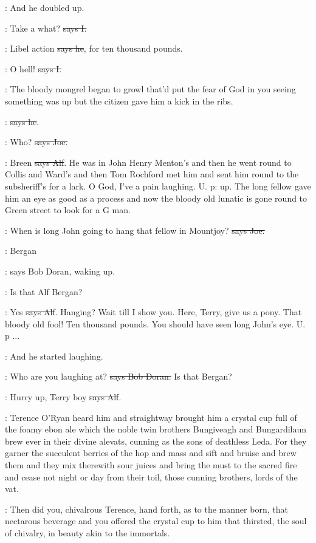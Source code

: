 \Nq:
And he doubled up.

:
Take a what? \sout{says I.}

\bergan:
Libel action \sout{says he},
for ten thousand pounds.

:
O hell! \sout{says I.}

\Nq:
The bloody mongrel began to growl that'd put the fear of God in you
seeing something was up but the citizen gave him a kick in the ribs.

\citizen:
 \sout{says he}.

\joe:
Who? \sout{says Joe.}

\bergan:
Breen \sout{says Alf}.
He was in John Henry Menton's and then he went round
to Collis and Ward's and then Tom Rochford met him and sent him round
to the subsheriff's for a lark. O God, I've a pain laughing. U. p: up. The
long fellow gave him an eye as good as a process
and now the bloody old
lunatic is gone round to Green street to look for a G man.

\joe:
When is long John going to hang that fellow in Mountjoy?
\sout{says Joe.}

\doran:
Bergan

\Nq:
says Bob Doran, waking up.

\doran:
Is that Alf Bergan?

\bergan:
Yes \sout{says Alf}. Hanging?
Wait till I show you. Here, Terry, give us a
pony. That bloody old fool! Ten thousand pounds. You should have seen long
John's eye. U. p ...

\Nq:
And he started laughing.

\doran:
Who are you laughing at? \sout{says Bob Doran.}
Is that Bergan?

\bergan:
Hurry up, Terry boy \sout{says Alf}.

:
Terence O'Ryan heard him
and straightway brought him a crystal
cup full of the foamy ebon ale which the noble twin brothers Bungiveagh
and Bungardilaun brew ever in their divine alevats, cunning as the sons of
deathless Leda. For they garner the succulent berries of the hop and mass
and sift and bruise and brew them and they mix therewith sour juices and
bring the must to the sacred fire and cease not night or day from their
toil, those cunning brothers, lords of the vat.

:
Then did you, chivalrous Terence, hand forth, as to the manner born,
that nectarous beverage and you offered the crystal cup to him that
thirsted, the soul of chivalry, in beauty akin to the immortals.

